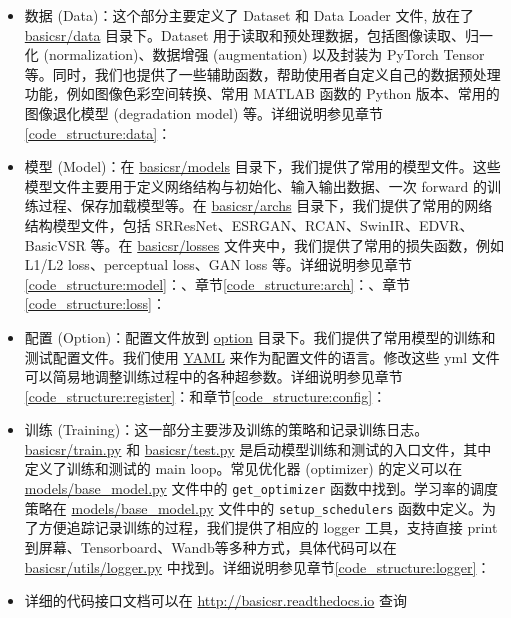 \documentclass[../main.tex]{subfiles}
\begin{document}
\begin{itemize}
    \item 数据 (Data)：这个部分主要定义了 Dataset 和 Data Loader 文件, 放在了 \href{https://github.com/XPixelGroup/BasicSR/tree/master/basicsr/data}{basicsr/data} 目录下。Dataset 用于读取和预处理数据，包括图像读取、归一化 (normalization)、数据增强 (augmentation) 以及封装为 PyTorch Tensor 等。同时，我们也提供了一些辅助函数，帮助使用者自定义自己的数据预处理功能，例如图像色彩空间转换、常用 MATLAB 函数的 Python 版本、常用的图像退化模型 (degradation model) 等。详细说明参见章节\ref{code_structure:data}：

    \item 模型 (Model)：在 \href{https://github.com/XPixelGroup/BasicSR/tree/master/basicsr/models}{basicsr/models} 目录下，我们提供了常用的模型文件。这些模型文件主要用于定义网络结构与初始化、输入输出数据、一次 forward 的训练过程、保存加载模型等。在 \href{https://github.com/XPixelGroup/BasicSR/tree/master/basicsr/archs}{basicsr/archs} 目录下，我们提供了常用的网络结构模型文件，包括 SRResNet、ESRGAN、RCAN、SwinIR、EDVR、BasicVSR 等。在 \href{https://github.com/XPixelGroup/BasicSR/tree/master/basicsr/losses}{basicsr/losses} 文件夹中，我们提供了常用的损失函数，例如 L1/L2 loss、perceptual loss、GAN loss 等。详细说明参见章节\ref{code_structure:model}：、章节\ref{code_structure:arch}：、章节\ref{code_structure:loss}：

    \item 配置 (Option)：配置文件放到 \href{https://github.com/XPixelGroup/BasicSR/tree/master/options}{option} 目录下。我们提供了常用模型的训练和测试配置文件。我们使用 \href{https://yaml.org/}{YAML} 来作为配置文件的语言。修改这些 yml 文件可以简易地调整训练过程中的各种超参数。详细说明参见章节\ref{code_structure:register}：和章节\ref{code_structure:config}：

    \item 训练 (Training)：这一部分主要涉及训练的策略和记录训练日志。\href{https://github.com/XPixelGroup/BasicSR/blob/master/basicsr/train.py}{basicsr/train.py} 和 \href{https://github.com/XPixelGroup/BasicSR/blob/master/basicsr/test.py}{basicsr/test.py} 是启动模型训练和测试的入口文件，其中定义了训练和测试的 main loop。常见优化器 (optimizer) 的定义可以在 \href{https://github.com/XPixelGroup/BasicSR/blob/master/basicsr/models/base_model.py}{models/base\_model.py} 文件中的 \texttt{get\_optimizer} 函数中找到。学习率的调度策略在 \href{https://github.com/XPixelGroup/BasicSR/blob/master/basicsr/models/base_model.py}{models/base\_model.py}  文件中的 \texttt{setup\_schedulers} 函数中定义。为了方便追踪记录训练的过程，我们提供了相应的 logger 工具，支持直接 print 到屏幕、Tensorboard、Wandb等多种方式，具体代码可以在 \href{https://github.com/XPixelGroup/BasicSR/blob/master/basicsr/utils/logger.py}{basicsr/utils/logger.py} 中找到。详细说明参见章节\ref{code_structure:logger}：

    \item 详细的代码接口文档可以在 \url{http://basicsr.readthedocs.io} 查询
\end{itemize}
\end{document}
